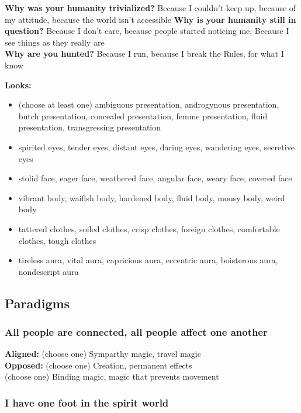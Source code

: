 \documentclass[
  oneside,
  statementpaper,
  9pt]{memoir}
\begin{document}
\textbf{Why was your humanity trivialized?} Because I couldn't keep up,
because of my attitude, because the world isn't accessible \textbf{Why
is your humanity still in question?} Because I don't care, because
people started noticing me, Because I see things as they really are\\
\textbf{Why are you hunted?} Because I run, because I break the Rules,
for what I know

\textbf{Looks:}

\begin{itemize}
\tightlist
\item
  (choose at least one) ambiguous presentation, androgynous
  presentation, butch presentation, concealed presentation, femme
  presentation, fluid presentation, transgressing presentation
\item
  spirited eyes, tender eyes, distant eyes, daring eyes, wandering eyes,
  secretive eyes
\item
  stolid face, eager face, weathered face, angular face, weary face,
  covered face
\item
  vibrant body, waifish body, hardened body, fluid body, mousy body,
  weird body
\item
  tattered clothes, soiled clothes, crisp clothes, foreign clothes,
  comfortable clothes, tough clothes
\item
  tireless aura, vital aura, capricious aura, eccentric aura, boisterous
  aura, nondescript aura
\end{itemize}

\hypertarget{paradigms-8}{%
\subsection{Paradigms}\label{paradigms-8}}

\hypertarget{all-people-are-connected-all-people-affect-one-another}{%
\subsubsection{All people are connected, all people affect one
another}\label{all-people-are-connected-all-people-affect-one-another}}

\textbf{Aligned:} (choose one) Symparthy magic, travel magic\\
\textbf{Opposed:} (choose one) Creation, permanent effects\\
(choose one) Binding magic, magic that prevents movement

\hypertarget{i-have-one-foot-in-the-spirit-world}{%
\subsubsection{I have one foot in the spirit
world}\label{i-have-one-foot-in-the-spirit-world}}
\end{document}
